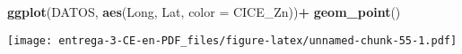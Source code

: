 \documentclass[
]{article}
\newenvironment{Shaded}{\begin{snugshade}}{\end{snugshade}}
\newcommand{\DataTypeTok}[1]{\textcolor[rgb]{0.13,0.29,0.53}{#1}}
\newcommand{\DecValTok}[1]{\textcolor[rgb]{0.00,0.00,0.81}{#1}}
\newcommand{\KeywordTok}[1]{\textcolor[rgb]{0.13,0.29,0.53}{\textbf{#1}}}
\newcommand{\NormalTok}[1]{#1}
\newcommand{\OperatorTok}[1]{\textcolor[rgb]{0.81,0.36,0.00}{\textbf{#1}}}
\newcommand{\StringTok}[1]{\textcolor[rgb]{0.31,0.60,0.02}{#1}}
\begin{document}
\begin{Shaded}
\begin{Highlighting}[]
\KeywordTok{ggplot}\NormalTok{(DATOS, }\KeywordTok{aes}\NormalTok{(Long, Lat, }\DataTypeTok{color =}\NormalTok{ CICE_Zn))}\OperatorTok{+}
\StringTok{  }\KeywordTok{geom_point}\NormalTok{()}
\end{Highlighting}
\end{Shaded}

\texttt{[image: entrega-3-CE-en-PDF\_files/figure-latex/unnamed-chunk-55-1.pdf]}

\begin{Shaded}
\end{Shaded}
\end{document}

